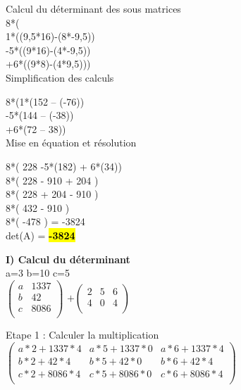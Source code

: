 \vspace{5mm} %
Calcul du déterminant des sous matrices \\

8*(\\
1*((9,5*16)-(8*-9,5))\\
-5*((9*16)-(4*-9,5))\\
+6*((9*8)-(4*9,5))) \\

\vspace{3mm} %
Simplification des calculs
\vspace{5mm} %

8*(1*(152 – (-76)) \\
  -5*(144 – (-38)) \\
  +6*(72 – 38)) \\

\vspace{2mm} %
Mise en équation et résolution
\vspace{5mm} %

8*( 228 -5*(182) + 6*(34)) \\
8*( 228 - 910 + 204 ) \\
8*( 228 + 204 - 910 ) \\
8*( 432 - 910 ) \\
8*( -478 ) = -3824 \\

det(A) = \hl{\textbf{-3824}}

\newpage
\textbf{I) Calcul du déterminant} \\

a=3 b=10 c=5 \\

$
\begin{pmatrix}
  a & 1337 \\
  b & 42 \\
  c & 8086 \\
\end{pmatrix}
$
\vspace{5mm} %
$
+
\begin{pmatrix}
  2 & 5 & 6 \\
  4 & 0 & 4 \\
\end{pmatrix}
$
\vspace{2mm} %

Etape 1 :  Calculer la multiplication \\

\vspace{3mm} %
$
\begin{pmatrix}
  a*2+1337*4 & a*5+1337*0  & a*6+1337*4 \\
  b*2+42*4   & b*5+42*0    & b*6+42*4   \\
  c*2+8086*4 & c*5+8086*0  & c*6+8086*4 \\
\end{pmatrix}
$\vspace{5mm} %

